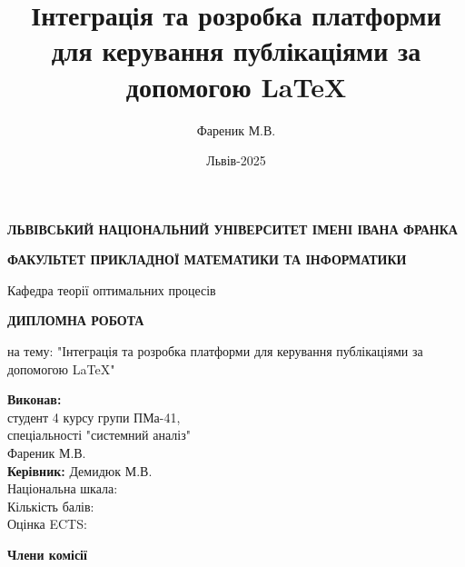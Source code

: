 \documentclass[a4paper,14pt]{extarticle}
\title{Інтеграція та розробка платформи для керування публікаціями за допомогою LaTeX}
\author{Фареник М.В.}
\date{Львів-2025}
\numberwithin{figure}{section}
\begin{document}
    
    \begin{titlepage}
        \begin{center}
        
        \footnotesize\textbf{ ЛЬВІВСЬКИЙ НАЦІОНАЛЬНИЙ УНІВЕРСИТЕТ ІМЕНІ ІВАНА ФРАНКА}
        
        \vspace{0.5cm}
        \textbf{ ФАКУЛЬТЕТ ПРИКЛАДНОЇ МАТЕМАТИКИ ТА ІНФОРМАТИКИ}
        
        \vspace{0.5cm}
        
        \hspace*{8cm}
        \small{Кафедра теорії оптимальних процесів}
        
        \vspace{3cm}
        \begin{spacing}{1} 
            \textbf{\Large ДИПЛОМНА РОБОТА}
            
            \large на тему:  "Інтеграція та розробка платформи для керування публікаціями за допомогою LaTeX"
        \end{spacing}
        
        \vspace{2cm}
        \hspace*{8cm}
        \begin{minipage}{0.7\textwidth} 
            \begin{flushleft}
                \normalsize\textbf{Виконав:} \\
                студент 4 курсу групи ПМа-41, \\
                спеціальності "системний аналіз" \\
                Фареник М.В. \\
                \textbf{Керівник:} Демидюк М.В. \\
                Національна шкала: \underline{\hspace{2cm}} \\
                Кількість балів: \underline{\hspace{1cm}} \\
                Оцінка ECTS: \underline{\hspace{1cm}}
            \end{flushleft}
        \end{minipage}
        
        
        \vspace{0.5cm}
        \begin{spacing}{1}
            \normalsize\textbf{Члени комісії}
            

\end{spacing}
\end{center}
\end{titlepage}
\end{document}
